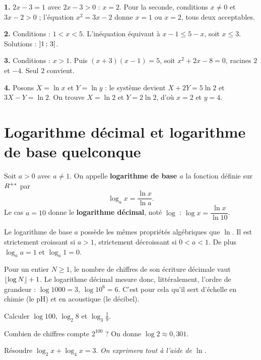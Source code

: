 \begin{corrige}
\textbf{1.} $2x-3 = 1$ avec $2x-3>0$ : $x = 2$. Pour la seconde, conditions
$x \neq 0$ et $3x-2>0$ ; l'équation $x^{2} = 3x-2$ donne $x=1$ ou $x=2$, tous
deux acceptables.

\textbf{2.} Conditions : $1<x<5$. L'inéquation équivaut à $x-1 \leq 5-x$, soit
$x \leq 3$. Solutions : $\left]1\,;\,3\right]$.

\textbf{3.} Conditions : $x>1$. Puis $(x+3)(x-1) = 5$, soit $x^{2}+2x-8=0$,
racines $2$ et $-4$. Seul $2$ convient.

\textbf{4.} Posons $X = \ln x$ et $Y = \ln y$ : le système devient
$X+2Y = 5\ln2$ et $3X-Y = \ln2$. On trouve $X = \ln 2$ et $Y = 2\ln 2$, d'où
$x = 2$ et $y = 4$.
\end{corrige}

\section{Logarithme décimal et logarithme de base quelconque}

\begin{definition}
Soit $a>0$ avec $a \neq 1$. On appelle \textbf{logarithme de base $a$} la
fonction définie sur $R^{+*}$ par
\[
  \log_{a} x = \frac{\ln x}{\ln a}.
\]
Le cas $a = 10$ donne le \textbf{logarithme décimal}, noté $\log$ :
$\log x = \dfrac{\ln x}{\ln 10}$.
\end{definition}

\begin{propriete}
Le logarithme de base $a$ possède les mêmes propriétés algébriques que $\ln$.
Il est strictement croissant si $a>1$, strictement décroissant si $0<a<1$. De
plus $\log_{a} a = 1$ et $\log_{a} 1 = 0$.
\end{propriete}

\begin{remarque}
Pour un entier $N \geq 1$, le nombre de chiffres de son écriture décimale vaut
$\left\lfloor \log N \right\rfloor+1$. Le logarithme décimal mesure donc, littéralement, l'ordre de
grandeur : $\log 1000 = 3$, $\log 10^{6} = 6$. C'est pour cela qu'il sert
d'échelle en chimie (le pH) et en acoustique (le décibel).
\end{remarque}

\begin{entrainement}
\exo[\niveau{1}] Calculer $\log 100$, $\log_{2} 8$ et $\log_{3} \frac{1}{9}$.

\exo[\niveau{2}] Combien de chiffres compte $2^{100}$ ? On donne
$\log 2 \approx 0{,}301$.

\exo[\niveau{3}] Résoudre $\log_{2} x + \log_{4} x = 3$. \emph{On exprimera
tout à l'aide de $\ln$.}
\end{entrainement}

